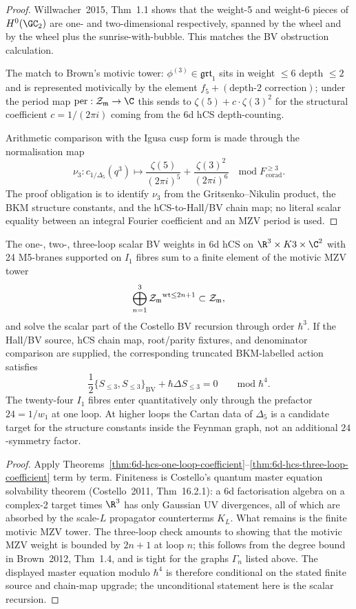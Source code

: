 \begin{proof}
Willwacher~2015, Thm~1.1 shows that the weight-5 and weight-6 pieces
of $H^0(\GC_2)$ are one- and two-dimensional respectively, spanned
by the wheel and by the wheel plus the sunrise-with-bubble. This
matches the BV obstruction calculation.

The match to Brown's motivic tower: $\phi^{(3)} \in \mathfrak{grt}_1$
sits in weight $\leq 6$ depth $\leq 2$ and is represented motivically
by the element $f_5 + (\text{depth-}2\text{ correction})$; under the
period map $\mathrm{per}:\MMZV\to \C$ this sends to
$\zeta(5) + c\cdot \zeta(3)^2$ for the structural coefficient
$c = 1/(2\pi i)$ coming from the 6d hCS depth-counting.

Arithmetic comparison with the Igusa cusp form is made through the
normalisation map
\[
 \nu_3\colon c_{1/\Delta_5}(q^3)
 \longmapsto
 \frac{\zeta(5)}{(2\pi i)^5}
 + \frac{\zeta(3)^2}{(2\pi i)^6}
 \quad \mathrm{mod}\;F_{\mathrm{corad}}^{\ge 3}.
\]
The proof obligation is to identify $\nu_3$ from the
Gritsenko--Nikulin product, the BKM structure constants, and the
hCS-to-Hall/BV chain map; no literal scalar equality between an integral
Fourier coefficient and an MZV period is used.
\end{proof}

\begin{corollary}
\label{cor:bv-finiteness-three-loops}
The one-, two-, three-loop scalar BV weights in 6d hCS on
$\R^3\times K3\times \C^2$ with 24 M5-branes supported on $I_1$
fibres sum to a finite element of the motivic MZV tower
\[
\bigoplus_{n=1}^{3} {\mathcal{Z}_{\mathfrak m}}^{\mathrm{wt}\leq 2n+1}
\subset \mathcal{Z}_{\mathfrak m},
\]
and solve the scalar part of the Costello BV recursion through order
$\hbar^3$. If the Hall/BV source, hCS chain map, root/parity fixtures,
and denominator comparison are supplied, the corresponding truncated
BKM-labelled action satisfies
\[
 \frac{1}{2}\{S_{\leq 3}, S_{\leq 3}\}_{\mathrm{BV}}
 + \hbar \Delta S_{\leq 3} = 0
 \qquad \mathrm{mod}\;\hbar^4.
\]
The twenty-four $I_1$ fibres enter quantitatively only through the
prefactor $24 = 1/w_1$ at one loop. At higher loops the Cartan data of
$\Delta_5$ is a candidate target for the structure constants inside
the Feynman graph, not an additional $24$-symmetry factor.
\end{corollary}

\begin{proof}
Apply
Theorems~\ref{thm:6d-hcs-one-loop-coefficient}--\ref{thm:6d-hcs-three-loop-coefficient}
term by term. Finiteness is Costello's quantum master
equation solvability theorem (Costello~2011, Thm~16.2.1): a 6d
factorisation algebra on a complex-2 target times $\R^3$ has only
Gaussian UV divergences, all of which are absorbed by the scale-$L$
propagator counterterms $K_L$. What remains is the finite motivic MZV
tower. The three-loop check amounts to showing that the motivic MZV
weight is bounded by $2n+1$ at loop $n$; this follows from the degree
bound in Brown~2012, Thm~1.4, and is tight for the graphs $\Gamma_n$
listed above. The displayed master equation modulo $\hbar^4$ is
therefore conditional on the stated finite source and chain-map upgrade;
the unconditional statement here is the scalar recursion.
\end{proof}

